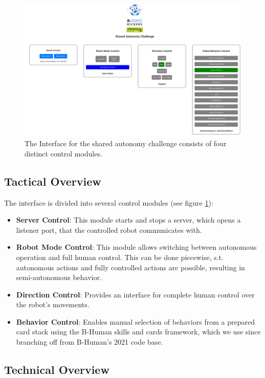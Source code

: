 \documentclass[a4paper]{article}
\begin{document}
\begin{figure}[h]
\centering
\includegraphics[width=\textwidth]{img/SAC}
\caption{The Interface for the shared autonomy challenge consists of four distinct control modules.}
\label{fig:interface}
\end{figure}

\newpage
\subsection{Tactical Overview}

The interface is divided into several control modules (see figure \ref{fig:interface}):
\begin{itemize}
	\item \textbf{Server Control}: This module starts and stops a server, which opens a listener port, that the controlled robot communicates with.
	\item \textbf{Robot Mode Control}: This module allows switching between autonomous operation and full human control. This can be done piecewise, s.t. autonomous actions and fully controlled actions are possible, resulting in semi-autonomous behavior.
	\item \textbf{Direction Control}: Provides an interface for complete human control over the robot's movements.
	\item \textbf{Behavior Control}: Enables manual selection of behaviors from a prepared card stack using the B-Human skills and cards framework, which we use since branching off from B-Human's 2021 code base.
\end{itemize}

\subsection{Technical Overview}
\end{document}
